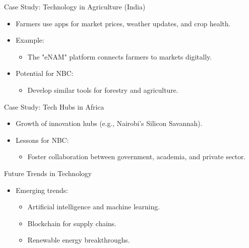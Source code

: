 \documentclass{beamer}
\begin{document}
\begin{frame}{Case Study: Technology in Agriculture (India)}
    \begin{itemize}
        \item Farmers use apps for market prices, weather updates, and crop health.
        \item Example:
        \begin{itemize}
            \item The "eNAM" platform connects farmers to markets digitally.
        \end{itemize}
        \item Potential for NBC:
        \begin{itemize}
            \item Develop similar tools for forestry and agriculture.
        \end{itemize}
    \end{itemize}
\end{frame}

\begin{frame}{Case Study: Tech Hubs in Africa}
    \begin{itemize}
        \item Growth of innovation hubs (e.g., Nairobi’s Silicon Savannah).
        \item Lessons for NBC:
        \begin{itemize}
            \item Foster collaboration between government, academia, and private sector.
        \end{itemize}
    \end{itemize}
\end{frame}

\begin{frame}{Future Trends in Technology}
    \begin{itemize}
        \item Emerging trends:
        \begin{itemize}
            \item Artificial intelligence and machine learning.
            \item Blockchain for supply chains.
            \item Renewable energy breakthroughs.
        \end{itemize}
    \end{itemize}
\end{frame}
\end{document}
